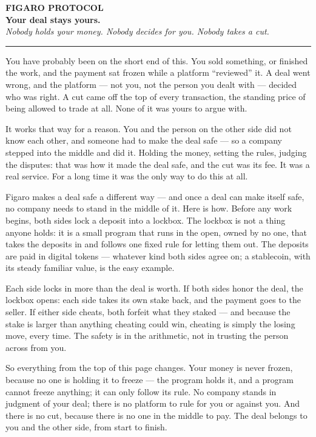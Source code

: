 \documentclass[11pt]{article}
\begin{document}
\begin{center}
  {\sffamily\bfseries\small\color{accent}FIGARO PROTOCOL}\\[6pt]
  {\sffamily\bfseries\LARGE Your deal stays yours.}\\[5pt]
  {\itshape Nobody holds your money. Nobody decides for you. Nobody takes a cut.}
\end{center}

\vspace{4pt}
{\color{ink}\rule{\linewidth}{0.9pt}}
\vspace{6pt}

You have probably been on the short end of this. You sold something, or finished the work, and the payment sat frozen while a platform ``reviewed'' it. A deal went wrong, and the platform --- not you, not the person you dealt with --- decided who was right. A cut came off the top of every transaction, the standing price of being allowed to trade at all. None of it was yours to argue with.

It works that way for a reason. You and the person on the other side did not know each other, and someone had to make the deal safe --- so a company stepped into the middle and did it. Holding the money, setting the rules, judging the disputes: that was how it made the deal safe, and the cut was its fee. It was a real service. For a long time it was the only way to do this at all.

Figaro makes a deal safe a different way --- and once a deal can make itself safe, no company needs to stand in the middle of it. Here is how. Before any work begins, both sides lock a deposit into a lockbox. The lockbox is not a thing anyone holds: it is a small program that runs in the open, owned by no one, that takes the deposits in and follows one fixed rule for letting them out. The deposits are paid in digital tokens --- whatever kind both sides agree on; a stablecoin, with its steady familiar value, is the easy example.

Each side locks in more than the deal is worth. If both sides honor the deal, the lockbox opens: each side takes its own stake back, and the payment goes to the seller. If either side cheats, both forfeit what they staked --- and because the stake is larger than anything cheating could win, cheating is simply the losing move, every time. The safety is in the arithmetic, not in trusting the person across from you.

So everything from the top of this page changes. Your money is never frozen, because no one is holding it to freeze --- the program holds it, and a program cannot freeze anything; it can only follow its rule. No company stands in judgment of your deal; there is no platform to rule for you or against you. And there is no cut, because there is no one in the middle to pay. The deal belongs to you and the other side, from start to finish.
\end{document}
